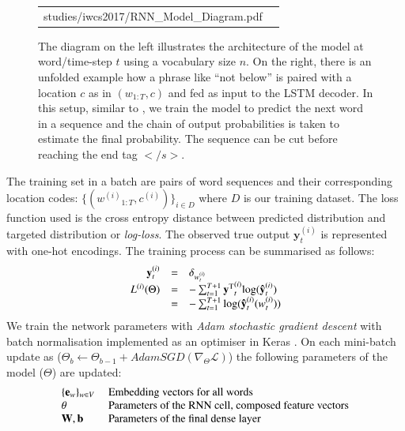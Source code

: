 \begin{figure}[h]
\begin{tabular}{p{} p{}}
{studies/iwcs2017/RNN_Model_Diagram.pdf}
\end{tabular}\vspace{0.5em}
\caption{\label{iwcs2017:fig:rnnmodel} The diagram on the left illustrates the
architecture of the model at word/time-step $t$ using a vocabulary size $n$. On the
right, there is an unfolded example how a phrase like ``not below'' is paired with a
location $c$ as in $(w_{1:T}, c)$ and fed as input to the LSTM decoder.
In this setup, similar to \cite{graves2013generating}, we train the model to
predict the next word in a sequence and the chain of output probabilities is taken to estimate
the final probability. The sequence can be cut before reaching the end tag
$</s>$. }
\end{figure}

The training set in a batch are pairs of word sequences and their corresponding
location codes: $\{({w^{(i)}}_{1:T}, c^{(i)})\}_{i \in D}$ where $D$ is our
training dataset. The loss function used is the cross entropy distance between
predicted distribution and targeted distribution or \emph{log-loss}. The
observed true output $\mathbf{y}^{(i)}_t$ is represented with one-hot encodings.
The training process can be summarised as follows:
\begin{equation}\label{iwcs2017:eq:log-loss}
\begin{array}{r c l}
  \mathbf{y}^{(i)}_t &=& \delta_{w^{(i)}_t} \\
  L^{(i)}(\Theta) &=& -\sum_{t=1}^{T+1}{\mathbf{y^\mathrm{T}}^{(i)}_t  \textrm{log}(\mathbf{\hat{y}}^{(i)}_t)} \\
  & = & -\sum_{t=1}^{T+1}{\textrm{log}(\mathbf{\hat{y}}^{(i)}_t(w^{(i)}_t))}
\end{array}
\end{equation}
\noindent We train the network parameters with \emph{Adam stochastic gradient descent}
\cite{kingma2014adam} with batch normalisation implemented as an optimiser in
Keras \cite{chollet2015keras}. On each mini-batch update as ($\Theta_{b} \leftarrow
\Theta_{b-1} + AdamSGD(\nabla_{\Theta} \mathcal{L})$) the following parameters of the model ($\Theta$) 
are updated:
\begin{equation}
\begin{array}{l l}
  \{\mathbf{e}_w\}_{w \in V}\ & \textrm{Embedding vectors for all words} \\
  \theta & \textrm{Parameters of the RNN cell, composed feature vectors}\\
  \mathbf{W}, \mathbf{b} & \textrm{Parameters of the final dense layer} \\
\end{array}
\end{equation}

